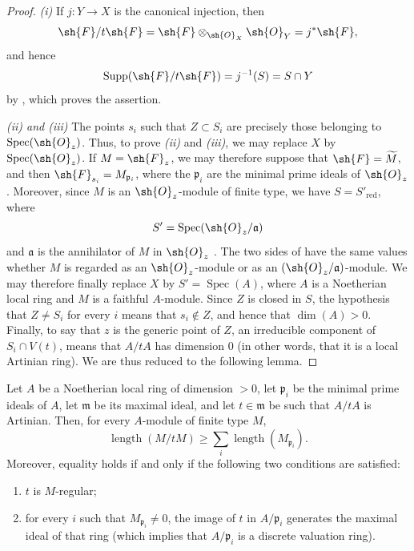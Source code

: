\begin{proof}
\emph{(i)} If $j:Y\to X$ is the canonical injection, then
\[
\sh{F}/t\sh{F}
  =\sh{F}\otimes_{\sh{O}_X}\sh{O}_Y
  =j^*\sh{F},
\]
and hence
\[
\operatorname{Supp}(\sh{F}/t\sh{F})
  =j^{-1}(S)=S\cap Y
\]
by , which proves the assertion.

\emph{(ii) and (iii)} The points $s_i$ such that $Z\subset S_i$ are precisely those belonging to $\operatorname{Spec}(\sh{O}_z)$.
Thus, to prove \emph{(ii)} and \emph{(iii)}, we may replace $X$ by $\operatorname{Spec}(\sh{O}_z)$.
If $M=\sh{F}_z$, we may therefore suppose that $\sh{F}=\widetilde{M}$, and then $\sh{F}_{s_i}=M_{\mathfrak p_i}$, where the $\mathfrak p_i$ are the minimal prime ideals of $\sh{O}_z$.
Moreover, since $M$ is an $\sh{O}_z$-module of finite type, we have $S=S'_{\mathrm{red}}$, where
\[
S'=\operatorname{Spec}(\sh{O}_z/\mathfrak a)
\]
and $\mathfrak a$ is the annihilator of $M$ in $\sh{O}_z$ .
The two sides of  have the same values whether $M$ is regarded as an $\sh{O}_z$-module or as an $(\sh{O}_z/\mathfrak a)$-module.
We may therefore finally replace $X$ by $S'=\operatorname{Spec}(A)$, where $A$ is a Noetherian local ring and $M$ is a faithful $A$-module.
Since $Z$ is closed in $S$, the hypothesis that $Z\neq S_i$ for every $i$ means that $s_i\notin Z$, and hence that $\dim(A)>0$.
Finally, to say that $z$ is the generic point of $Z$, an irreducible component of $S_i\cap V(t)$, means that $A/tA$ has dimension $0$ (in other words, that it is a local Artinian ring).
We are thus reduced to the following lemma.
\end{proof}

\begin{lemma}[3.4.1.2]
\label{IV.3.4.1.2}
Let $A$ be a Noetherian local ring of dimension $>0$, let $\mathfrak p_i$ be the minimal prime ideals of $A$, let $\mathfrak m$ be its maximal ideal, and let $t\in\mathfrak m$ be such that $A/tA$ is Artinian.
Then, for every $A$-module of finite type $M$,
\[
\label{IV.3.4.1.3}
\operatorname{length}(M/tM)
  \geqslant
  \sum_i\operatorname{length}(M_{\mathfrak p_i}).
\tag{3.4.1.3}
\]
Moreover, equality holds if and only if the following two conditions are satisfied:
\begin{enumerate}
  \item[\emph{$\alpha$)}] $t$ is $M$-regular;
  \item[\emph{$\beta$)}] for every $i$ such that $M_{\mathfrak p_i}\neq 0$, the image of $t$ in $A/\mathfrak p_i$ generates the maximal ideal of that ring (which implies that $A/\mathfrak p_i$ is a discrete valuation ring).
\end{enumerate}
\end{lemma}

